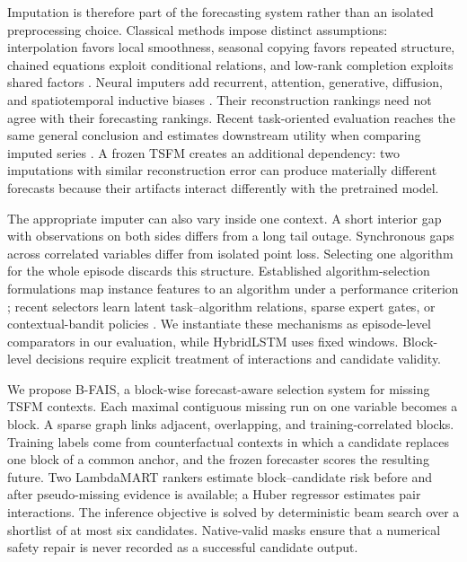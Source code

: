 \documentclass{article}
\newcommand{\bfais}{\textsc{B-FAIS}\xspace}
\begin{document}
Imputation is therefore part of the forecasting system rather than an isolated preprocessing choice. Classical methods impose distinct assumptions: interpolation favors local smoothness, seasonal copying favors repeated structure, chained equations exploit conditional relations, and low-rank completion exploits shared factors \citep{vanbuuren2011mice,stekhoven2012missforest,mazumder2010softimpute,yu2016trmf}. Neural imputers add recurrent, attention, generative, diffusion, and spatiotemporal inductive biases \citep{cao2018brits,fortuin2020gpvae,tashiro2021csdi,du2023saits,nie2024imputeformer}. Their reconstruction rankings need not agree with their forecasting rankings. Recent task-oriented evaluation reaches the same general conclusion and estimates downstream utility when comparing imputed series \citep{wang2024taskoriented}. A frozen TSFM creates an additional dependency: two imputations with similar reconstruction error can produce materially different forecasts because their artifacts interact differently with the pretrained model.

The appropriate imputer can also vary inside one context. A short interior gap with observations on both sides differs from a long tail outage. Synchronous gaps across correlated variables differ from isolated point loss. Selecting one algorithm for the whole episode discards this structure. Established algorithm-selection formulations map instance features to an algorithm under a performance criterion \citep{rice1976algorithm}; recent selectors learn latent task--algorithm relations, sparse expert gates, or contextual-bandit policies \citep{misir2017alors,zhao2021automatic,hazimeh2021dselect,zhou2020neuralucb}. We instantiate these mechanisms as episode-level comparators in our evaluation, while HybridLSTM uses fixed windows. Block-level decisions require explicit treatment of interactions and candidate validity.

We propose \bfais, a block-wise forecast-aware selection system for missing TSFM contexts. Each maximal contiguous missing run on one variable becomes a block. A sparse graph links adjacent, overlapping, and training-correlated blocks. Training labels come from counterfactual contexts in which a candidate replaces one block of a common anchor, and the frozen forecaster scores the resulting future. Two LambdaMART rankers estimate block--candidate risk before and after pseudo-missing evidence is available; a Huber regressor estimates pair interactions. The inference objective is solved by deterministic beam search over a shortlist of at most six candidates. Native-valid masks ensure that a numerical safety repair is never recorded as a successful candidate output.
\end{document}
